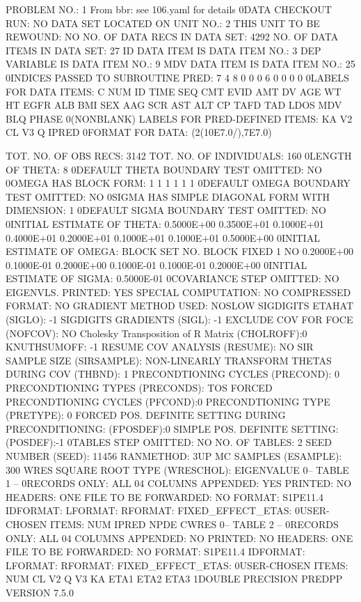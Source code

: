 \documentclass[
  letterpaper,
  toc=chapterentrywithdots,
  listof=totoc,
  11pt,
  headings=small,
  usegeometry]{scrreprt}
\begin{document}
\begin{nonmemlisting}
 PROBLEM NO.:         1
 From bbr: see 106.yaml for details
0DATA CHECKOUT RUN:              NO
 DATA SET LOCATED ON UNIT NO.:    2
 THIS UNIT TO BE REWOUND:        NO
 NO. OF DATA RECS IN DATA SET:     4292
 NO. OF DATA ITEMS IN DATA SET:  27
 ID DATA ITEM IS DATA ITEM NO.:   3
 DEP VARIABLE IS DATA ITEM NO.:   9
 MDV DATA ITEM IS DATA ITEM NO.: 25
0INDICES PASSED TO SUBROUTINE PRED:
   7   4   8   0   0   0   6   0   0   0   0
0LABELS FOR DATA ITEMS:
 C NUM ID TIME SEQ CMT EVID AMT DV AGE WT HT EGFR ALB BMI SEX AAG SCR AST ALT CP TAFD TAD LDOS MDV BLQ PHASE
0(NONBLANK) LABELS FOR PRED-DEFINED ITEMS:
 KA V2 CL V3 Q IPRED
0FORMAT FOR DATA:
 (2(10E7.0/),7E7.0)

 TOT. NO. OF OBS RECS:     3142
 TOT. NO. OF INDIVIDUALS:      160
0LENGTH OF THETA:   8
0DEFAULT THETA BOUNDARY TEST OMITTED:    NO
0OMEGA HAS BLOCK FORM:
  1
  1  1
  1  1  1
0DEFAULT OMEGA BOUNDARY TEST OMITTED:    NO
0SIGMA HAS SIMPLE DIAGONAL FORM WITH DIMENSION:   1
0DEFAULT SIGMA BOUNDARY TEST OMITTED:    NO
0INITIAL ESTIMATE OF THETA:
   0.5000E+00  0.3500E+01  0.1000E+01  0.4000E+01  0.2000E+01  0.1000E+01  0.1000E+01  0.5000E+00
0INITIAL ESTIMATE OF OMEGA:
 BLOCK SET NO.   BLOCK                                                                    FIXED
        1                                                                                   NO
                  0.2000E+00
                  0.1000E-01   0.2000E+00
                  0.1000E-01   0.1000E-01   0.2000E+00
0INITIAL ESTIMATE OF SIGMA:
 0.5000E-01
0COVARIANCE STEP OMITTED:        NO
 EIGENVLS. PRINTED:             YES
 SPECIAL COMPUTATION:            NO
 COMPRESSED FORMAT:              NO
 GRADIENT METHOD USED:     NOSLOW
 SIGDIGITS ETAHAT (SIGLO):                  -1
 SIGDIGITS GRADIENTS (SIGL):                -1
 EXCLUDE COV FOR FOCE (NOFCOV):              NO
 Cholesky Transposition of R Matrix (CHOLROFF):0
 KNUTHSUMOFF:                                -1
 RESUME COV ANALYSIS (RESUME):               NO
 SIR SAMPLE SIZE (SIRSAMPLE):
 NON-LINEARLY TRANSFORM THETAS DURING COV (THBND): 1
 PRECONDTIONING CYCLES (PRECOND):        0
 PRECONDTIONING TYPES (PRECONDS):        TOS
 FORCED PRECONDTIONING CYCLES (PFCOND):0
 PRECONDTIONING TYPE (PRETYPE):        0
 FORCED POS. DEFINITE SETTING DURING PRECONDITIONING: (FPOSDEF):0
 SIMPLE POS. DEFINITE SETTING: (POSDEF):-1
0TABLES STEP OMITTED:    NO
 NO. OF TABLES:           2
 SEED NUMBER (SEED):    11456
 RANMETHOD:             3UP
 MC SAMPLES (ESAMPLE):    300
 WRES SQUARE ROOT TYPE (WRESCHOL): EIGENVALUE
0-- TABLE   1 --
0RECORDS ONLY:    ALL
04 COLUMNS APPENDED:    YES
 PRINTED:                NO
 HEADERS:               ONE
 FILE TO BE FORWARDED:   NO
 FORMAT:                S1PE11.4
 IDFORMAT:
 LFORMAT:
 RFORMAT:
 FIXED_EFFECT_ETAS:
0USER-CHOSEN ITEMS:
 NUM IPRED NPDE CWRES
0-- TABLE   2 --
0RECORDS ONLY:    ALL
04 COLUMNS APPENDED:    NO
 PRINTED:                NO
 HEADERS:               ONE
 FILE TO BE FORWARDED:   NO
 FORMAT:                S1PE11.4
 IDFORMAT:
 LFORMAT:
 RFORMAT:
 FIXED_EFFECT_ETAS:
0USER-CHOSEN ITEMS:
 NUM CL V2 Q V3 KA ETA1 ETA2 ETA3
1DOUBLE PRECISION PREDPP VERSION 7.5.0


\end{nonmemlisting}
\end{document}
